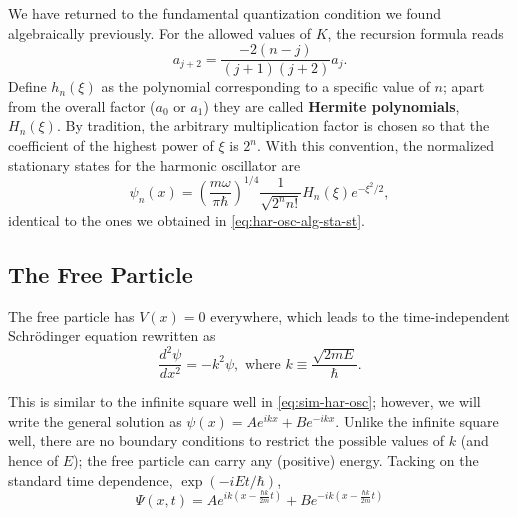 \documentclass{article}
\begin{document}
We have returned to the fundamental quantization condition we found
algebraically previously. For the allowed values of $K$, the recursion formula
reads
\begin{equation} \label{eq:har-osc-ana-a-2}
  a_{j+2} = \frac{-2(n - j)}{(j+1)(j+2)}a_j.
\end{equation}
Define $h_n(\xi)$ as the polynomial corresponding to a specific value of $n$;
apart from the overall factor ($a_0$ or $a_1$) they are called \textbf{Hermite
polynomials}, $H_n(\xi)$. By tradition, the arbitrary multiplication factor is
chosen so that the coefficient of the highest power of $\xi$ is $2^n$. With
this convention, the normalized stationary states for the harmonic oscillator
are
\begin{equation} \label{eq:har-osc-ana-sta-st}
  \boxed{
    \psi_n(x) = \left(\frac{m\omega}{\pi\hbar}\right)^{1/4}
    \frac{1}{\sqrt{2^nn!}}H_n(\xi)e^{-\xi^2/2},
  }
\end{equation}
identical to the ones we obtained in \eqref{eq:har-osc-alg-sta-st}.

\subsection{The Free Particle}

The free particle has $V(x) = 0$ everywhere, which leads to the
time-independent Schr\"{o}dinger equation rewritten as
\begin{equation} \label{eq:free-par}
  \frac{d^2\psi}{dx^2} = -k^2\psi,
  \text{ where } k \equiv \frac{\sqrt{2mE}}{\hbar}.
\end{equation}

This is similar to the infinite square well in \eqref{eq:sim-har-osc}; however,
we will write the general solution as $\psi(x) = Ae^{ikx} + Be^{-ikx}$. Unlike
the infinite square well, there are no boundary conditions to restrict the
possible values of $k$ (and hence of $E$); the free particle can carry any
(positive) energy. Tacking on the standard time dependence, $\exp(-iEt/\hbar)$,
\begin{equation} \label{eq:free-par-1}
  \Psi(x, t)
  = Ae^{ik(x - \frac{\hbar k}{2m}t)} + Be^{-ik(x - \frac{\hbar k}{2m}t)}
\end{equation}
\end{document}
